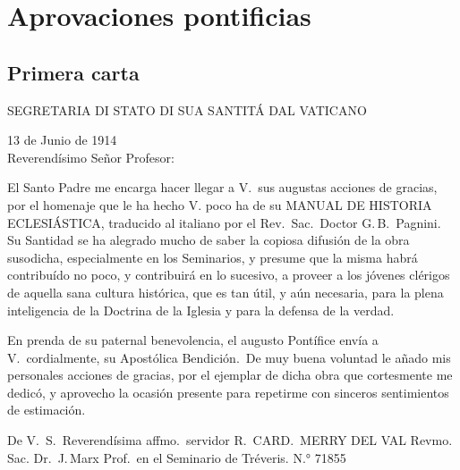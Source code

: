 \raggedbottom{} \documentclass[12pt, a4paper]{book}
\begin{document}
\section{Aprovaciones pontificias}
\subsection{Primera carta}
\begin{center}
  \large SEGRETARIA DI STATO DI SUA SANTITÁ DAL VATICANO
\end{center}
\begin{flushright}
  13 de Junio de 1914\\
  Reverendísimo Señor Profesor:
\end{flushright}

El Santo Padre me encarga hacer llegar a V.\ sus augustas acciones de gracias, por el homenaje que le ha hecho V. poco ha de su MANUAL DE HISTORIA ECLESIÁSTICA, traducido al italiano por el Rev.\, Sac.\, Doctor G.\,B.\, Pagnini. Su Santidad se ha alegrado mucho de saber la copiosa difusión de la obra susodicha, especialmente en los Seminarios, y presume que la misma habrá contribuído no poco, y contribuirá en lo sucesivo, a proveer a los jóvenes clérigos de aquella sana cultura histórica, que es tan útil, y aún necesaria, para la plena inteligencia de la Doctrina de la Iglesia y para la defensa de la verdad.

En prenda de su paternal benevolencia, el augusto Pontífice envía a V.\ cordialmente, su Apostólica Bendición.\  De muy buena voluntad le añado mis personales acciones de gracias, por el ejemplar de dicha obra que cortesmente me dedicó, y aprovecho la ocasión presente para repetirme con sinceros sentimientos de estimación.

De V.\ S.\ Reverendísima affmo.\ servidor
R.\, CARD.\, MERRY DEL VAL
Revmo. Sac. Dr.\, J.\,Marx Prof.\ en el Seminario de Tréveris.
N.° 71855
\end{document}
